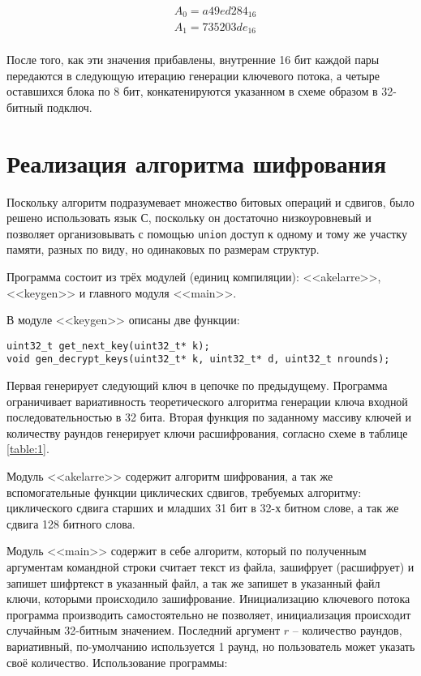 \documentclass[12pt, a4paper]{article}
\begin{document}
\begin{equation}
\begin{split}
& A_0 = a49ed284_{16} \\
& A_1 = 735203de_{16} \\
\end{split}
\end{equation}

После того, как эти значения прибавлены, внутренние 16 бит каждой пары передаются в следующую итерацию генерации ключевого потока, а четыре оставшихся блока по 8 бит, конкатенируются указанном в схеме образом в 32-битный подключ.

\section{Реализация алгоритма шифрования}

Поскольку алгоритм подразумевает множество битовых операций и сдвигов, было решено использовать язык С, поскольку он достаточно низкоуровневый и позволяет организовывать с помощью \lstinline{union} доступ к одному и тому же участку памяти, разных по виду, но одинаковых по размерам структур.

Программа состоит из трёх модулей (единиц компиляции): <<akelarre>>, <<keygen>> и главного модуля <<main>>.

В модуле <<keygen>> описаны две функции: 

\begin{lstlisting}
uint32_t get_next_key(uint32_t* k);
void gen_decrypt_keys(uint32_t* k, uint32_t* d, uint32_t nrounds);
\end{lstlisting}

Первая генерирует следующий ключ в цепочке по предыдущему. Программа ограничивает вариативность теоретического алгоритма генерации ключа входной последовательностью в 32 бита. Вторая функция по заданному массиву ключей и количеству раундов генерирует ключи расшифрования, согласно схеме в таблице \ref{table:1}.

Модуль <<akelarre>> содержит алгоритм шифрования, а так же вспомогательные функции циклических сдвигов, требуемых алгоритму: циклического сдвига старших и младших 31 бит в 32-х битном слове, а так же сдвига 128 битного слова.

Модуль <<main>> содержит в себе алгоритм, который по полученным аргументам командной строки считает текст из файла, зашифрует (расшифрует) и запишет шифртекст в указанный файл, а так же запишет в указанный файл ключи, которыми происходило зашифрование. Инициализацию ключевого потока программа производить самостоятельно не позволяет, инициализация происходит случайным 32-битным значением. Последний аргумент $r$ -- количество раундов, вариативный, по-умолчанию используется 1 раунд, но пользователь может указать своё количество. Использование программы: 
\end{document}

